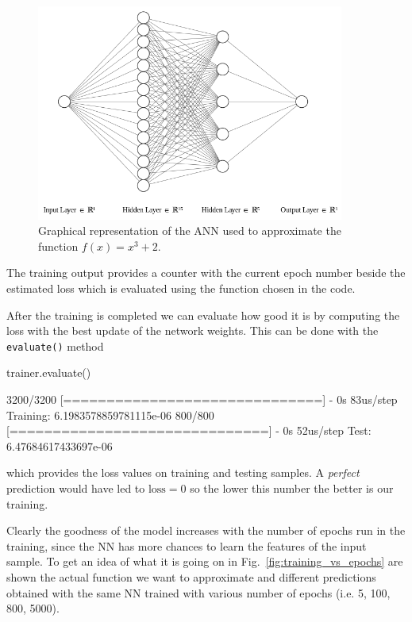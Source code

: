 \begin{figure}[htb]
	\centering
	\includegraphics[width=0.9\textwidth]{figures/ann_1.png}
	\caption{Graphical representation of the ANN used to approximate the function $f(x) = x^3 + 2$.}
    \label{fig:ann_1}
\end{figure}

The training output provides a counter with the current epoch number beside the estimated loss which is evaluated using the function chosen in the code.

After the training is completed we can evaluate how good it is by computing the loss with the best update of the network weights. This can be done with the \texttt{evaluate()} method

\begin{ipython}
trainer.evaluate()
\end{ipython}
\begin{ioutput}
3200/3200 [==============================] - 0s 83us/step
Training: 6.1983578859781115e-06
800/800 [==============================] - 0s 52us/step
Test: 6.47684617433697e-06
\end{ioutput}
\noindent
which provides the loss values on training and testing samples.
A \emph{perfect} prediction would have led to \(\textrm{loss}=0\) so the lower this number the better is our training. 

Clearly the goodness of the model increases with the number of epochs run in the training, since the NN has more chances to learn the features of the input sample. 
To get an idea of what it is going on in Fig.~\ref{fig:training_vs_epochs} are shown the actual function we want to approximate and different predictions obtained with the same NN trained with various number of epochs (i.e. 5, 100, 800, 5000).


